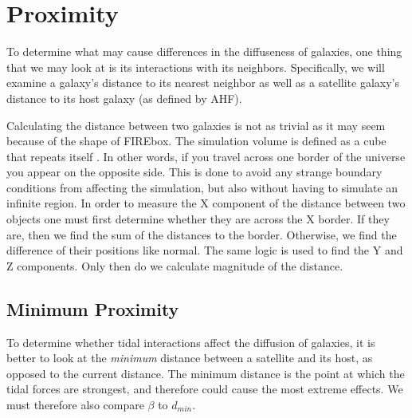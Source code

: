 \section{Proximity}
To determine what may cause differences in the diffuseness of galaxies, one thing that we may look at is its interactions with its neighbors. Specifically, we will examine a galaxy's distance to its nearest neighbor as well as a satellite galaxy's distance to its host galaxy (as defined by AHF).

Calculating the distance between two galaxies is not as trivial as it may seem because of the shape of FIREbox. The simulation volume is defined as a cube that repeats itself \citep{feldmannFIREboxSimulatingGalaxies2022}. In other words, if you travel across one border of the universe you appear on the opposite side. This is done to avoid any strange boundary conditions from affecting the simulation, but also without having to simulate an infinite region. In order to measure the X component of the distance between two objects one must first determine whether they are across the X border. If they are, then we find the sum of the distances to the border. Otherwise, we find the difference of their positions like normal. The same logic is used to find the Y and Z components. Only then do we calculate magnitude of the distance.

\subsection{Minimum Proximity}

To determine whether tidal interactions affect the diffusion of galaxies, it is better to look at the \emph{minimum} distance between a satellite and its host, as opposed to the current distance. The minimum distance is the point at which the tidal forces are strongest, and therefore could cause the most extreme effects. We must therefore also compare $\beta$ to $d_{min}$. 